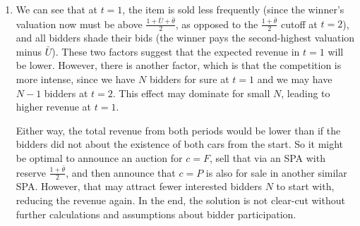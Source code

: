 \documentclass[a4paper]{article}
\begin{document}
\begin{enumerate}
	\item We can see that at $t=1$, the item is sold less frequently (since the winner's valuation now must be above $\frac{1+\bar{U}+\bar{\theta}}{2}$, as opposed to the $\frac{1+\bar{\theta}}{2}$ cutoff at $t=2$), and all bidders shade their bids (the winner pays the second-highest valuation minus $\bar{U}$). These two factors suggest that the expected revenue in $t=1$ will be lower. However, there is another factor, which is that the competition is more intense, since we have $N$ bidders for sure at $t=1$ and we may have $N-1$ bidders at $t=2$. This effect may dominate for small $N$, leading to higher revenue at $t=1$. 
	
	Either way, the total revenue from both periods would be lower than if the bidders did not about the existence of both cars from the start. So it might be optimal to announce an auction for $c=F$, sell that via an SPA with reserve $\frac{1+\bar{\theta}}{2}$, and then announce that $c=P$ is also for sale in another similar SPA. However, that may attract fewer interested bidders $N$ to start with, reducing the revenue again. In the end, the solution is not clear-cut without further calculations and assumptions about bidder participation.
\end{enumerate}
\fi
\end{document}
